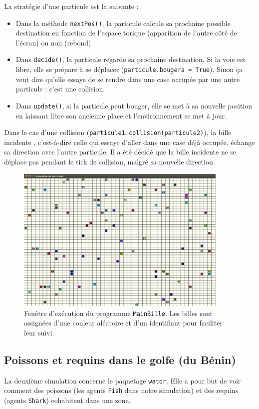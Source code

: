 \documentclass[a4paper]{article}
\begin{document}
\medskip
La stratégie d'une particule est la suivante :
\begin{itemize}
\item Dans la méthode \texttt{nextPos()}, la particule calcule sa prochaine possible destination en fonction de l'espace torique (apparition de \og l'autre côté \fg{} de l'écran) ou non (rebond).
\item Dans \texttt{decide()}, la particule regarde sa prochaine destination. Si la voie est libre, elle se prépare à se déplacer (\texttt{particule.bougera = True}). Sinon ça veut dire qu'elle essaye de se rendre dans une case occupée par une autre particule : c'est une collision.
\item Dans \texttt{update()}, si la particule peut bouger, elle se met à sa nouvelle position en laissant libre son ancienne place et l'environnement se met à jour.
\end{itemize}

\medskip
Dans le cas d'une collision (\texttt{particule1.collision(particule2)}), la bille \og incidente \fg{}, c'est-à-dire celle qui essaye d'aller dans une case déjà occupée, échange sa direction avec l'autre particule. Il a été décidé que la bille incidente ne se déplace pas pendant le tick de collision, malgré sa nouvelle direction.
 
\begin{figure}[!h]
\centering
\includegraphics[height=7cm]{particules.png}
\caption{Fenêtre d'exécution du programme \texttt{MainBille}. Les billes sont assignées d'une couleur aléatoire et d'un identifiant pour faciliter leur suivi.}
\end{figure}
\subsection{Poissons et requins dans le golfe (du Bénin)}
La deuxième simulation concerne le paquetage \texttt{wator}. Elle a pour but de voir comment des poissons (les agents \texttt{Fish} dans notre simulation) et des requins (agents \texttt{Shark}) cohabitent dans une zone. 
\end{document}
